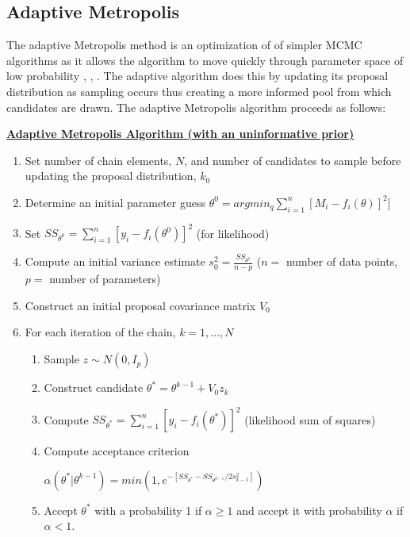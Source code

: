 \documentclass{article}
\begin{document}
\subsection{Adaptive Metropolis}
The adaptive Metropolis method is an optimization of of simpler MCMC algorithms as it allows the algorithm to move quickly through parameter space of low probability \cite{collis}, \cite{adaptive_andrieu}, \cite{adaptive_andrieu}. The adaptive algorithm does this by updating its proposal distribution as sampling occurs thus creating a more informed pool from which candidates are drawn. The adaptive Metropolis algorithm proceeds as follows:
\begin{tcolorbox} \label{box:am}
\textbf{\underline{Adaptive Metropolis Algorithm (with an uninformative prior)}}
\begin{enumerate}
\item Set number of chain elements, $N$, and number of candidates to sample before updating the proposal distribution, $k_0$
    \item Determine an initial parameter guess $\theta^0 = argmin_q \sum_{i=1}^{n}[M_i - f_i(\theta)]^2]$
    \item Set $SS_{\theta^0} = \sum_{i = 1}^{n}[y_i - f_i(\theta^0)]^2$ (for likelihood)
    \item Compute an initial variance estimate $s_0^2 = \frac{SS_{\theta^0}}{n-p}$ ($n =$ number of data points, $p = $ number of parameters)
    \item Construct an initial proposal covariance matrix $V_0$ 
    \item For each iteration of the chain, $k = 1,...,N$
    \begin{enumerate}
        \item Sample $z \sim N(0,I_p)$
        \item Construct candidate $\theta^* = \theta^{k-1}+ V_0z_k$
        \item Compute $SS_{\theta^*} = \sum_{i = 1}^{n}[y_i - f_i(\theta^*)]^2$ (likelihood sum of squares)
        \item Compute acceptance criterion
            \begin{center}
                $\alpha(\theta^* | \theta^{k-1}) = min(1, e^{-[SS_{\theta^*}-SS_{\theta^{k-1}}/2s_{k-1}^2]})$
            \end{center}
        \item Accept $\theta^*$ with a probability 1 if $\alpha \geq 1$ and accept it with probability $\alpha$ if $\alpha < 1$.
        \begin{itemize}

\end{itemize}
\end{enumerate}
\end{enumerate}
\end{tcolorbox}
\end{document}
